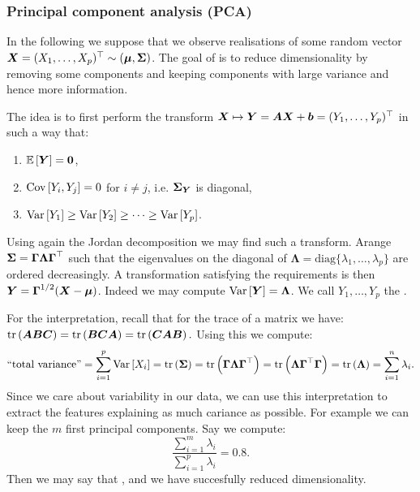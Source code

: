 \subsubsection{Principal component analysis (PCA)}
In the following we suppose that we observe realisations of some random vector $\boldsymbol{X}=(X_1,\dots,X_p)^\top \sim (\boldsymbol{\mu}, \boldsymbol{\Sigma})$. The goal of  is to reduce dimensionality by removing some components and keeping components with large variance and hence more information. 

The idea is to first perform the transform $\boldsymbol{X} \mapsto \boldsymbol{Y} = \boldsymbol{A} \boldsymbol{X} + \boldsymbol{b} = (Y_1,\dots,Y_p)^\top$ in such a way that:
\begin{enumerate}
    \item $\mathbb{E}\left[\boldsymbol{Y}\right] = \boldsymbol{0}$,
    \item $\mathrm{Cov}\left[Y_i, Y_j\right] = 0$ for $i\ne j$, i.e. $\boldsymbol{\Sigma}_{\boldsymbol{Y}}$ is diagonal,
    \item $\mathrm{Var}\left[Y_1\right] \geq \mathrm{Var}\left[Y_2\right] \geq \dots \geq \mathrm{Var}\left[Y_p\right]$.
\end{enumerate}
Using again the Jordan decomposition we may find such a transform. Arange $\boldsymbol{\Sigma} = \boldsymbol{\Gamma}\boldsymbol{\Lambda}\boldsymbol{\Gamma}^\top$ such that the eigenvalues on the diagonal of $\boldsymbol{\Lambda} = \textrm{diag}\{\lambda_1, \dots, \lambda_p\}$ are ordered decreasingly. A transformation satisfying the requirements is then $\boldsymbol{Y} = \boldsymbol{\Gamma}^{1/2}(\boldsymbol{X} - \boldsymbol{\mu})$. Indeed we may compute $\mathrm{Var}\left[\boldsymbol{Y}\right] = \boldsymbol{\Lambda}$. We call $Y_1,\dots, Y_p$ the . 

For the interpretation, recall that for the trace of a matrix we have:
$
    \mathrm{tr}\left(\boldsymbol{A}\boldsymbol{B}\boldsymbol{C}\right)=\mathrm{tr}\left(\boldsymbol{B}\boldsymbol{C}\boldsymbol{A}\right)=\mathrm{tr}\left(\boldsymbol{C}\boldsymbol{A}\boldsymbol{B}\right). 
$
Using this we compute:
\begin{align*}
    \textrm{``total variance''} 
    = \sum_{i=1}^p \mathrm{Var}\left[X_i\right]
    = \mathrm{tr}\left(\boldsymbol{\Sigma}\right)
    = \mathrm{tr}\left(\boldsymbol{\Gamma}\boldsymbol{\Lambda}\boldsymbol{\Gamma}^\top\right)
    = \mathrm{tr}\left(\boldsymbol{\Lambda}\boldsymbol{\Gamma}^\top\boldsymbol{\Gamma}\right)
    = \mathrm{tr}\left(\boldsymbol{\Lambda}\right)
    = \sum_{i=1}^n \lambda_i.
\end{align*}
Since we care about variability in our data, we can use this interpretation to extract the features explaining as much cariance as possible. For example we can keep the $m$ first principal components. Say we compute:
$$
    \frac{\sum_{i=1}^m\lambda_i}{\sum_{i=1}^p\lambda_i} = 0.8.
$$
Then we may say that , and we have succesfully reduced dimensionality. 

